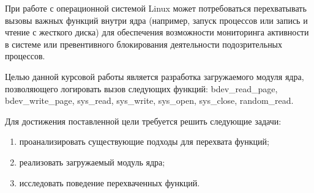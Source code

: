 \Introduction
    При работе с операционной системой Linux может потребоваться перехватывать
    вызовы важных функций внутри ядра (например, запуск процессов или запись и чтение с жесткого диска)
    для обеспечения возможности мониторинга активности в системе или 
    превентивного блокирования деятельности подозрительных процессов. 
    
    Целью данной курсовой работы является разработка загружаемого модуля ядра,
    позволяющего логировать вызов следующих функций: 
    bdev\_read\_page, 
    bdev\_write\_page, 
    sys\_read, sys\_write, 
    sys\_open, 
    sys\_close, 
    random\_read.

    Для достижения поставленной цели требуется решить следующие задачи:
    \begin{enumerate}
        \item проанализировать существующие подходы для перехвата функций;
        \item реализовать загружаемый модуль ядра;
        \item исследовать поведение перехваченных функций.
    \end{enumerate}

\pagebreak